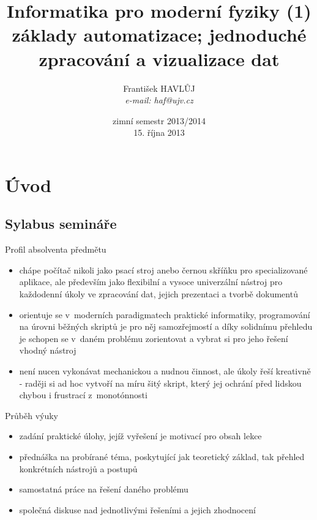 \documentclass{beamer}
\title[IMF (1)]{Informatika pro moderní fyziky (1)\\základy automatizace; jednoduché zpracování a vizualizace dat}
\author[Franti\v{s}ek HAVL\r{U}J, ORF ÚJV Řež]{Franti\v{s}ek HAVL\r{U}J\\{\scriptsize \emph{e-mail: haf@ujv.cz}}}
\date{zimní semestr 2013/2014\\15. října 2013}
\institute[ORF ÚJV Řež]
{ÚJV Řež\\oddělení Reaktorové fyziky a podpory palivového cyklu}
\begin{document}
\begin{frame}
  \titlepage
\end{frame}

\begin{frame}
  \tableofcontents
\end{frame}

\section{Úvod}

\subsection{Sylabus semináře}

\begin{frame}{Profil absolventa předmětu}
  \begin{itemize}
    \item chápe počítač nikoli jako psací stroj anebo černou skříňku pro specializované aplikace, ale především jako flexibilní a vysoce univerzální nástroj pro každodenní úkoly ve zpracování dat, jejich prezentaci a tvorbě dokumentů
    \item orientuje se v~moderních paradigmatech praktické informatiky, programování na úrovni běžných skriptů je pro něj samozřejmostí a díky solidnímu přehledu je schopen se v~daném problému zorientovat a vybrat si pro jeho řešení vhodný nástroj
    \item není nucen vykonávat mechanickou a nudnou činnost, ale úkoly řeší kreativně - raději si ad hoc vytvoří na míru šitý skript, který jej ochrání před lidskou chybou i frustrací z~monotónnosti
  \end{itemize}
\end{frame}

\begin{frame}{Průběh výuky}
  \begin{itemize}
    \item zadání praktické úlohy, jejíž vyřešení je motivací pro obsah lekce
    \item přednáška na probírané téma, poskytující jak teoretický základ, tak přehled konkrétních nástrojů a postupů
    \item samostatná práce na řešení daného problému
    \item společná diskuse nad jednotlivými řešeními a jejich zhodnocení
  \end{itemize}
\end{frame}
\end{document}
